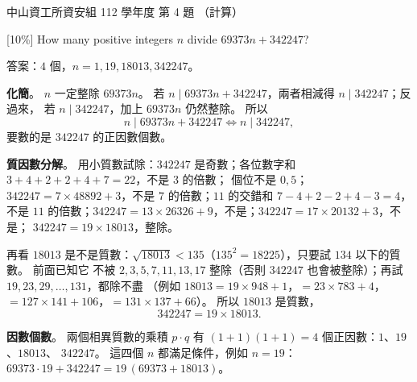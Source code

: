 \begin{pastexam}[label={px:nsysu-112-dmalg-04}]{中山資工所資安組 112 學年度 第 4 題}
（計算）

{[10\%]} How many positive integers $n$ divide $69373n + 342247$?
\end{pastexam}

\begin{pastsoln}
答案：$4$ 個，$n = 1, 19, 18013, 342247$。

\textbf{化簡}。 $n$ 一定整除 $69373n$。 若 $n \mid 69373n + 342247$，兩者相減得 $n \mid 342247$；反過來，
若 $n \mid 342247$，加上 $69373n$ 仍然整除。 所以
\[
n \mid 69373n + 342247 \iff n \mid 342247,
\]
要數的是 $342247$ 的正因數個數。

\textbf{質因數分解}。 用小質數試除：$342247$ 是奇數；各位數字和 $3 + 4 + 2 + 2 + 4 + 7 = 22$，不是 $3$ 的倍數；
個位不是 $0, 5$；$342247 = 7 \times 48892 + 3$，不是 $7$ 的倍數；$11$ 的交錯和 $7 - 4 + 2 - 2 + 4 - 3 = 4$，
不是 $11$ 的倍數；$342247 = 13 \times 26326 + 9$，不是；$342247 = 17 \times 20132 + 3$，不是；
$342247 = 19 \times 18013$，整除。

再看 $18013$ 是不是質數：$\sqrt{18013} < 135$（$135^2 = 18225$），只要試 $134$ 以下的質數。 前面已知它
不被 $2, 3, 5, 7, 11, 13, 17$ 整除（否則 $342247$ 也會被整除）；再試 $19, 23, 29, \ldots, 131$，都除不盡
（例如 $18013 = 19 \times 948 + 1$，$= 23 \times 783 + 4$，$= 127 \times 141 + 106$，$= 131 \times 137 + 66$）。
所以 $18013$ 是質數，
\[
342247 = 19 \times 18013.
\]

\textbf{因數個數}。 兩個相異質數的乘積 $p \cdot q$ 有 $(1 + 1)(1 + 1) = 4$ 個正因數：$1$、$19$、$18013$、
$342247$。 這四個 $n$ 都滿足條件，例如 $n = 19$：$69373 \cdot 19 + 342247 = 19\,(69373 + 18013)$。
\end{pastsoln}
